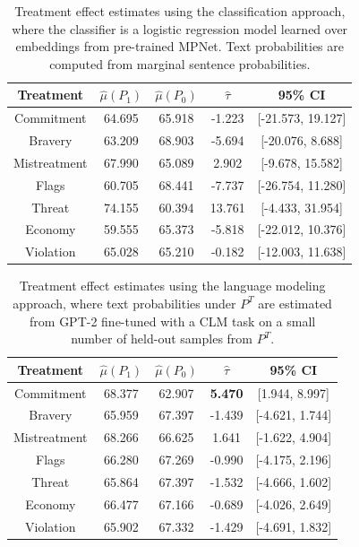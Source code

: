\documentclass{article}
\begin{document}
\begin{table}[!ht]
    \centering
    \begin{tabular}{c|cccc}
        \toprule
        Treatment & $\hat{\mu}(P_1)$ & $\hat{\mu}(P_0)$ & $\hat{\tau}$ & 95\% CI \\
        \midrule
        Commitment & 64.695 & 65.918 & \textcolor{red!80!black}{-1.223} & [-21.573, 19.127] \\
        Bravery & 63.209 & 68.903 & \textcolor{red!80!black}{-5.694} & [-20.076, 8.688] \\
        Mistreatment & 67.990 & 65.089 & \textcolor{green!50!black}{2.902} & [-9.678, 15.582] \\
        Flags & 60.705 & 68.441 & \textcolor{red!80!black}{-7.737} & [-26.754, 11.280] \\
        Threat & 74.155 & 60.394 & \textcolor{green!50!black}{13.761} & [-4.433, 31.954] \\
        Economy & 59.555 & 65.373 & \textcolor{red!80!black}{-5.818} & [-22.012, 10.376] \\
        Violation & 65.028 & 65.210 & \textcolor{red!80!black}{-0.182} & [-12.003, 11.638] \\
        \bottomrule
    \end{tabular}
    \caption{Treatment effect estimates using the classification approach, where the classifier is a logistic regression model learned over embeddings from pre-trained MPNet. Text probabilities are computed from marginal sentence probabilities.}
    \label{tab:results_clf2_old}
\end{table}

\begin{table}[!ht]
    \centering
    \begin{tabular}{c|cccc}
        \toprule
        Treatment & $\hat{\mu}(P_1)$ & $\hat{\mu}(P_0)$ & $\hat{\tau}$ & 95\% CI \\
        \midrule
        Commitment & 68.377 & 62.907 & \textbf{\textcolor{green!50!black}{5.470}} & [1.944, 8.997] \\
        Bravery & 65.959 & 67.397 & \textcolor{red!80!black}{-1.439} & [-4.621, 1.744] \\
        Mistreatment & 68.266 & 66.625 & \textcolor{green!50!black}{1.641} & [-1.622, 4.904] \\
        Flags & 66.280 & 67.269 & \textcolor{red!80!black}{-0.990} & [-4.175, 2.196] \\
        Threat & 65.864 & 67.397 & \textcolor{red!80!black}{-1.532} & [-4.666, 1.602] \\
        Economy & 66.477 & 67.166 & \textcolor{red!80!black}{-0.689} & [-4.026, 2.649] \\
        Violation & 65.902 & 67.332 & \textcolor{red!80!black}{-1.429} & [-4.691, 1.832] \\
        \bottomrule
    \end{tabular}
    \caption{Treatment effect estimates using the language modeling approach, where text probabilities under $P^T$ are estimated from GPT-2 fine-tuned with a CLM task on a small number of held-out samples from $P^T$.}
    \label{tab:results_lm2_old}
\end{table}
\end{document}
